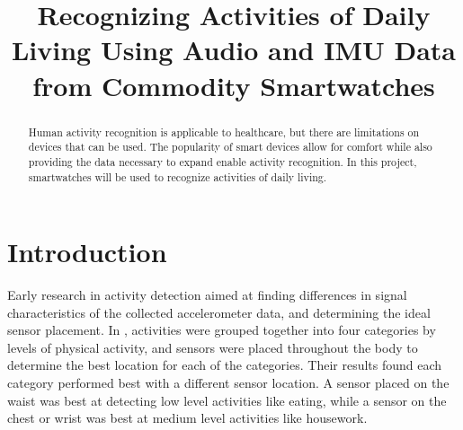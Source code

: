 \documentclass[conference]{IEEEtran}
\begin{document}
\title{Recognizing Activities of Daily Living Using Audio and IMU Data from Commodity Smartwatches
}

\author{

\and
{}

\and
{}
}

\maketitle

\begin{abstract}
Human activity recognition is applicable to healthcare, but there are limitations on devices that can be used.
The popularity of smart devices allow for comfort while also providing the data necessary to expand enable activity recognition.
In this project, smartwatches will be used to recognize activities of daily living.
\end{abstract}


\section{Introduction}

Early research in activity detection aimed at finding differences in signal characteristics of the collected accelerometer data, and determining the ideal sensor placement. 
In \cite{2011_Sensor_Positioning}, activities were grouped together into four categories by levels of physical activity, and sensors were placed throughout the body to determine the best location for each of the categories.
Their results found each category performed best with a different sensor location. A sensor placed on the waist was best at detecting low level activities like eating, while a sensor on the chest or wrist was best at medium level activities like housework.
\end{document}
